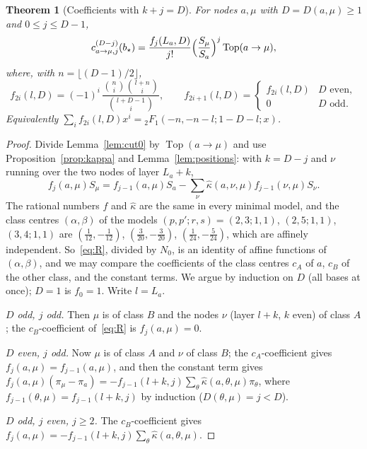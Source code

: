 \documentclass[11pt]{article}
\newtheorem{theorem}{Theorem}
\theoremstyle{remark}
\begin{document}
\begin{theorem}[Coefficients with $k+j=D$]\label{thm:kjD}
For nodes $a,\mu$ with $D=D(a,\mu)\ge1$ and $0\le j\le D-1$,
\[
 c^{(D-j)}_{a\to\mu,j}(b_\star)=\frac{f_j(L_a,D)}{j!}
 \Bigl(\frac{S_\mu}{S_a}\Bigr)^{j}\operatorname{Top}(a\to\mu),
\]
where, with $n=\lfloor(D-1)/2\rfloor$,
\[
 f_{2i}(l,D)=(-1)^i\,\frac{\binom ni\binom{l+n}i}{\binom{l+D-1}i},\qquad
 f_{2i+1}(l,D)=\begin{cases}f_{2i}(l,D)&D\text{ even},\\0&D\text{ odd}.\end{cases}
\]
Equivalently $\sum_if_{2i}(l,D)x^i={}_2F_1(-n,-n-l;1-D-l;x)$.
\end{theorem}

\begin{proof}
Divide Lemma~\ref{lem:cut0} by $\operatorname{Top}(a\to\mu)$ and use
Proposition~\ref{prop:kappa} and Lemma~\ref{lem:positions}: with $k=D-j$ and $\nu$
running over the two nodes of layer $L_a+k$,
\begin{equation}\label{eq:R}
 f_j(a,\mu)S_\mu=f_{j-1}(a,\mu)S_a
 -\sum_\nu\hat\kappa(a,\nu,\mu)f_{j-1}(\nu,\mu)S_\nu .
\end{equation}
The rational numbers $f$ and $\hat\kappa$ are the same in every minimal model,
and the class centres $(\alpha,\beta)$ of the models $(p,p';r,s)=(2,3;1,1)$,
$(2,5;1,1)$, $(3,4;1,1)$ are $(\frac1{12},-\frac1{12})$,
$(\frac3{20},-\frac3{20})$, $(\frac1{24},-\frac5{24})$, which are affinely
independent.  So~\eqref{eq:R}, divided by $N_0$, is an identity of affine
functions of $(\alpha,\beta)$, and we may compare the coefficients of the class
centres $c_A$ of $a$, $c_B$ of the other class, and the constant terms.  We
argue by induction on $D$ (all bases at once); $D=1$ is $f_0=1$.  Write
$l=L_a$.

\emph{$D$ odd, $j$ odd.}  Then $\mu$ is of class $B$ and the nodes $\nu$ (layer
$l+k$, $k$ even) of class $A$; the $c_B$-coefficient of~\eqref{eq:R} is
$f_j(a,\mu)=0$.

\emph{$D$ even, $j$ odd.}  Now $\mu$ is of class $A$ and $\nu$ of class $B$;
the $c_A$-coefficient gives $f_j(a,\mu)=f_{j-1}(a,\mu)$, and then the constant
term gives
$f_j(a,\mu)(\pi_\mu-\pi_a)=-f_{j-1}(l+k,j)\sum_\theta\hat\kappa(a,\theta,\mu)\pi_\theta$,
where $f_{j-1}(\theta,\mu)=f_{j-1}(l+k,j)$ by induction ($D(\theta,\mu)=j<D$).

\emph{$D$ odd, $j$ even, $j\ge2$.}  The $c_B$-coefficient gives
$f_j(a,\mu)=-f_{j-1}(l+k,j)\sum_\theta\hat\kappa(a,\theta,\mu)$.


\end{proof}
\end{document}
